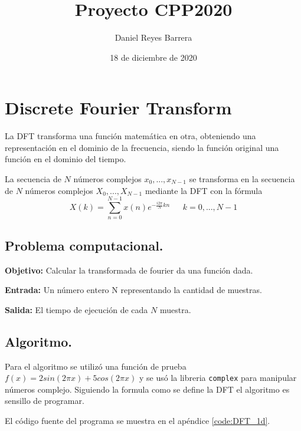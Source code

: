 \documentclass[12pt,letterpaper]{article}
\title{{Proyecto CPP2020}}
\author{Daniel Reyes Barrera}
\date{18 de diciembre de 2020}
\begin{document}
\maketitle




\section{Discrete Fourier Transform}

La DFT transforma una funci\'on matem\'atica en otra, obteniendo una representaci\'on en el dominio de la frecuencia, siendo la funci\'on original una funci\'on en el dominio del tiempo.

La secuencia de $N$ n\'umeros complejos $ x_0 , ..., x_{N-1} $ se transforma en la secuencia de $N$ n\'umeros complejos $ X_0 , ..., X_{N-1} $ mediante la DFT con la f\'ormula
$$
 X(k) = \sum_{n=0}^{N-1} x(n) e ^ {- \frac{i2\pi}{N}kn} \ \ \ \ \ \ \ k = 0,..., N-1
$$

\subsection{Problema computacional.}
\textbf{Objetivo:} Calcular la transformada de fourier da una funci\'on dada.

\textbf{Entrada:} Un n\'umero entero N representando la cantidad de muestras.

\textbf{Salida:} El tiempo de ejecuci\'on de cada $N$ muestra.

\subsection{Algoritmo.}
Para el algoritmo se utiliz\'o una funci\'on de prueba $f(x) = 2sin(2 \pi x) + 5cos(2 \pi x) $ y se us\'o la libreria \texttt{complex} para manipular n\'umeros complejo. Siguiendo la formula como se define la DFT el algoritmo es sensillo de programar.

El c\'odigo fuente del programa se muestra en el ap\'endice \ref{code:DFT_1d}.
\end{document}

